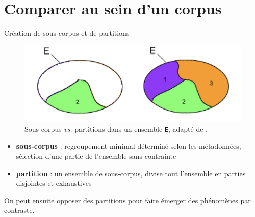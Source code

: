 \documentclass[xetex,xcolor={table,usenames,dvipsnames}]{beamer}
\newcommand{\bolder}[1]{{\color{purple}\bfseries#1}}
\begin{document}
\section{Comparer au sein d'un corpus}

\begin{frame}{Création de sous-corpus et de partitions}
		\begin{figure}[h] %
		\centering
		\includegraphics[width=.5\linewidth]{img/partition_sous-corpus.png}
		\caption{Sous-corpus \textit{vs.} partitions dans un ensemble \texttt{E}, adapté de \textcite{fort}.}
		\label{fig:ling_out_TAL}
	\end{figure}
	\begin{itemize}
		\item \bolder{sous-corpus} : regroupement \og{}minimal\fg{} déterminé selon les métadonnées, sélection d'une partie de l'ensemble sans contrainte
		\item \bolder{partition} : un ensemble de sous-corpus, divise tout l'ensemble en parties disjointes et exhaustives
	\end{itemize}
	On peut ensuite \og{}opposer\fg{} des partitions pour faire émerger des	phénomènes par contraste.
 
\end{frame}
\end{document}
